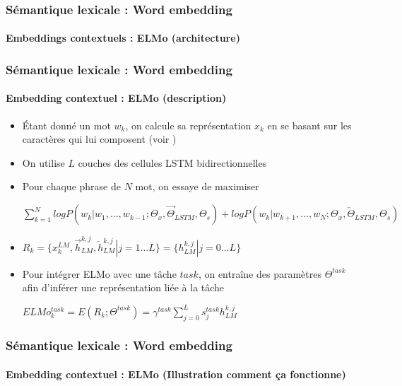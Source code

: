 \documentclass[xcolor=table]{beamer}
\begin{document}
\begin{frame}
\frametitle{Sémantique lexicale : Word embedding}
\framesubtitle{Embeddings contextuels : ELMo (architecture)}
	
	
\end{frame}

\begin{frame}
\frametitle{Sémantique lexicale : Word embedding}
\framesubtitle{Embedding contextuel : ELMo (description)}

\begin{itemize}
	\item Étant donné un mot $w_k$, on calcule sa représentation $x_k$ en se basant sur les caractères qui lui composent (voir \cite{2015-kim-al})
	\item On utilise $L$ couches des cellules LSTM bidirectionnelles 
	\item Pour chaque  phrase de $N$ mot, on essaye de maximiser\\ 
	\begin{center}
		$\sum_{k=1}^{N} 
	log P(w_k | w_1,\ldots,w_{k-1}; \Theta_x, \overrightarrow{\Theta}_{LSTM}, \Theta_s)
	+
	log P(w_k | w_{k+1},\ldots,w_{N}; \Theta_x, \overleftarrow{\Theta}_{LSTM}, \Theta_s)
	$
	\end{center}
	
	\item $R_k = \{x_k^{LM}, \overrightarrow{h}_{LM}^{k, j}, \overleftarrow{h}_{LM}^{k, j} | j= 1 \ldots L \}
	= \{h_{LM}^{k, j} | j= 0 \ldots L \}
	$
	
	\item Pour intégrer ELMo avec une tâche  $task$, on entraîne des paramètres $\Theta^{task}$ afin d'inférer une représentation liée à la tâche \\
	\begin{center}
		$ELMo_k^{task} = E(R_k; \Theta^{task}) = \gamma^{task} \sum_{j=0}^{L} s_j^{task} h_{LM}^{k, j}$
	\end{center}
\end{itemize}

\end{frame}

\begin{frame}
\frametitle{Sémantique lexicale : Word embedding}
\framesubtitle{Embedding contextuel : ELMo (Illustration comment ça fonctionne)}

\vspace{-3pt}
\begin{center}
\end{center}
	
\end{frame}
\end{document}
